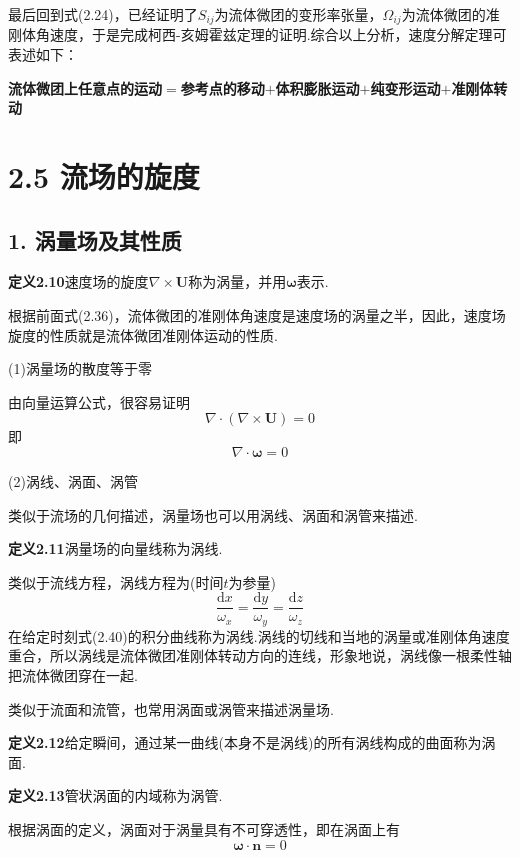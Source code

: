 最后回到式(2.24)，已经证明了$S_{ij}$为流体微团的变形率张量，$\Omega_{ij}$为流体微团的准刚体角速度，于是完成柯西-亥姆霍兹定理的证明.综合以上分析，速度分解定理可表述如下：

\textbf{流体微团上任意点的运动$=$参考点的移动$+$体积膨胀运动$+$纯变形运动$+$准刚体转动}

\section*{2.5  流场的旋度}

\subsection*{1. 涡量场及其性质}

\noindent\textbf{定义2.10}\quad 速度场的旋度$\nabla\times\boldsymbol{U}$称为涡量，并用$\boldsymbol{\omega}$表示.

根据前面式(2.36)，流体微团的准刚体角速度是速度场的涡量之半，因此，速度场旋度的性质就是流体微团准刚体运动的性质.

(1)涡量场的散度等于零

由向量运算公式，很容易证明
\[
\nabla\cdot(\nabla\times\boldsymbol{U})=0
\]
即
\begin{equation*}
\nabla\cdot\boldsymbol{\omega}=0
\tag{2.39}
\end{equation*}

(2)涡线、涡面、涡管

类似于流场的几何描述，涡量场也可以用涡线、涡面和涡管来描述.

\noindent\textbf{定义2.11}\quad 涡量场的向量线称为涡线.

类似于流线方程，涡线方程为(时间$t$为参量)
\begin{equation*}
\frac{\mathrm{d}x}{\omega_x}=\frac{\mathrm{d}y}{\omega_y}=\frac{\mathrm{d}z}{\omega_z}
\tag{2.40}
\end{equation*}
在给定时刻式(2.40)的积分曲线称为涡线.涡线的切线和当地的涡量或准刚体角速度重合，所以涡线是流体微团准刚体转动方向的连线，形象地说，涡线像一根柔性轴把流体微团穿在一起.

类似于流面和流管，也常用涡面或涡管来描述涡量场.

\noindent\textbf{定义2.12}\quad 给定瞬间，通过某一曲线(本身不是涡线)的所有涡线构成的曲面称为涡面.

\noindent\textbf{定义2.13}\quad 管状涡面的内域称为涡管.

根据涡面的定义，涡面对于涡量具有不可穿透性，即在涡面上有
\begin{equation*}
\boldsymbol{\omega}\cdot\boldsymbol{n}=0
\tag{2.41}
\end{equation*}

